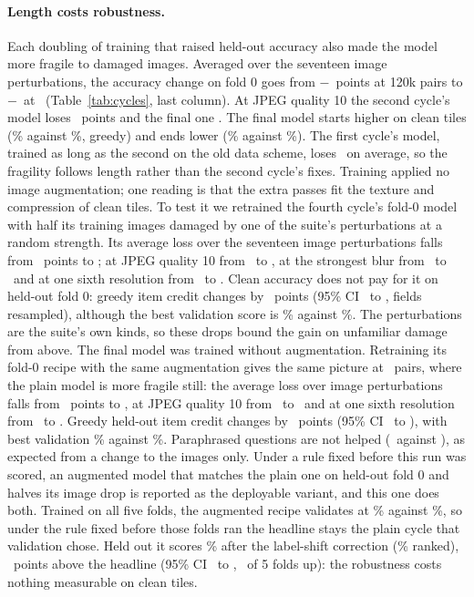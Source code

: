 \documentclass[10pt,twocolumn]{article}
\begin{document}
\paragraph{Length costs robustness.} Each doubling of training that raised held-out accuracy also made the model more fragile to damaged images. Averaged over the seventeen image perturbations, the accuracy change on fold 0 goes from $-$\vtwoPerturbed\ points at 120k pairs to $-$\blipPerturbed\ at \finalPairs\ (Table~\ref{tab:cycles}, last column). At JPEG quality 10 the second cycle's model loses \vtwoJpegDrop\ points and the final one \blipJpegDrop. The final model starts higher on clean tiles (\blipRobustClean\% against \vtwoRobustClean\%, greedy) and ends lower (\blipJpegAcc\% against \vtwoJpegAcc\%). The first cycle's model, trained as long as the second on the old data scheme, loses \vonePerturbed\ on average, so the fragility follows length rather than the second cycle's fixes. Training applied no image augmentation; one reading is that the extra passes fit the texture and compression of clean tiles. To test it we retrained the fourth cycle's fold-0 model with half its training images damaged by one of the suite's perturbations at a random strength. Its average loss over the seventeen image perturbations falls from \cFourPerturbed\ points to \augFourPerturbed; at JPEG quality 10 from \cFourJpegDrop\ to \augFourJpegDrop, at the strongest blur from \cFourBlurDrop\ to \augFourBlurDrop\ and at one sixth resolution from \cFourResDrop\ to \augFourResDrop. Clean accuracy does not pay for it on held-out fold 0: greedy item credit changes by \augFourHeld\ points (95\% CI \augFourHeldLo\ to \augFourHeldHi, fields resampled), although the best validation score is \augFourVal\% against \augFourPlainVal\%. The perturbations are the suite's own kinds, so these drops bound the gain on unfamiliar damage from above. The final model was trained without augmentation. Retraining its fold-0 recipe with the same augmentation gives the same picture at \finalPairs\ pairs, where the plain model is more fragile still: the average loss over image perturbations falls from \cSixPerturbed\ points to \augSixPerturbed, at JPEG quality 10 from \cSixJpegDrop\ to \augSixJpegDrop\ and at one sixth resolution from \cSixResDrop\ to \augSixResDrop. Greedy held-out item credit changes by \augSixHeld\ points (95\% CI \augSixHeldLo\ to \augSixHeldHi), with best validation \augSixVal\% against \augSixPlainVal\%. Paraphrased questions are not helped (\cSixParaphraseDrop\ against \augSixParaphraseDrop), as expected from a change to the images only. Under a rule fixed before this run was scored, an augmented model that matches the plain one on held-out fold 0 and halves its image drop is reported as the deployable variant, and this one does both. Trained on all five folds, the augmented recipe validates at \augFiveVal\% against \finalVal\%, so under the rule fixed before those folds ran the headline stays the plain cycle that validation chose. Held out it scores \augFiveCorr\% after the label-shift correction (\augFiveMean\% ranked), \augFiveChange\ points above the headline (95\% CI \augFiveChangeLo\ to \augFiveChangeHi, \augFiveChangeFolds\ of 5 folds up): the robustness costs nothing measurable on clean tiles.
\end{document}
